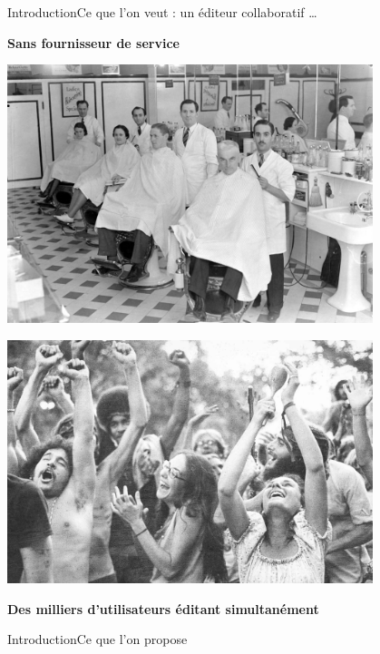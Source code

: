 \begin{frame}{Introduction}{Ce que l'on veut : un éditeur collaboratif \ldots}
  \vspace{-0.75cm}
  
  \begin{minipage}{0.45\textwidth}
    \hfill \NO{\xmark}\textbf{Sans fournisseur de service}
  \end{minipage}
  \begin{minipage}{0.45\textwidth}
    \includegraphics[width=0.8\textwidth]{img/service.jpg}
  \end{minipage}

  \vspace{-0.75cm}

  \begin{minipage}{0.45\textwidth}
    \hfill \includegraphics[width=0.8\textwidth]{img/crowd.jpg}
  \end{minipage}
  \begin{minipage}{0.45\textwidth}
    \textbf{Des milliers d'utilisateurs éditant simultanément} \NO{\xmark}
  \end{minipage}

\end{frame}


\begin{frame}{Introduction}{Ce que l'on propose}


\end{frame}


